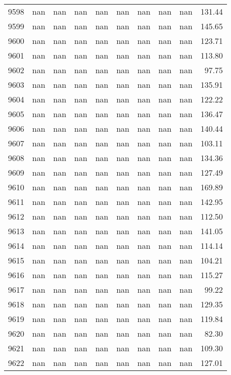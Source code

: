 \begin{tabular}{lrrrrrrrrr}
9598 & nan & nan & nan & nan & nan & nan & nan & nan & 131.44 \\
9599 & nan & nan & nan & nan & nan & nan & nan & nan & 145.65 \\
9600 & nan & nan & nan & nan & nan & nan & nan & nan & 123.71 \\
9601 & nan & nan & nan & nan & nan & nan & nan & nan & 113.80 \\
9602 & nan & nan & nan & nan & nan & nan & nan & nan & 97.75 \\
9603 & nan & nan & nan & nan & nan & nan & nan & nan & 135.91 \\
9604 & nan & nan & nan & nan & nan & nan & nan & nan & 122.22 \\
9605 & nan & nan & nan & nan & nan & nan & nan & nan & 136.47 \\
9606 & nan & nan & nan & nan & nan & nan & nan & nan & 140.44 \\
9607 & nan & nan & nan & nan & nan & nan & nan & nan & 103.11 \\
9608 & nan & nan & nan & nan & nan & nan & nan & nan & 134.36 \\
9609 & nan & nan & nan & nan & nan & nan & nan & nan & 127.49 \\
9610 & nan & nan & nan & nan & nan & nan & nan & nan & 169.89 \\
9611 & nan & nan & nan & nan & nan & nan & nan & nan & 142.95 \\
9612 & nan & nan & nan & nan & nan & nan & nan & nan & 112.50 \\
9613 & nan & nan & nan & nan & nan & nan & nan & nan & 141.05 \\
9614 & nan & nan & nan & nan & nan & nan & nan & nan & 114.14 \\
9615 & nan & nan & nan & nan & nan & nan & nan & nan & 104.21 \\
9616 & nan & nan & nan & nan & nan & nan & nan & nan & 115.27 \\
9617 & nan & nan & nan & nan & nan & nan & nan & nan & 99.22 \\
9618 & nan & nan & nan & nan & nan & nan & nan & nan & 129.35 \\
9619 & nan & nan & nan & nan & nan & nan & nan & nan & 119.84 \\
9620 & nan & nan & nan & nan & nan & nan & nan & nan & 82.30 \\
9621 & nan & nan & nan & nan & nan & nan & nan & nan & 109.30 \\
9622 & nan & nan & nan & nan & nan & nan & nan & nan & 127.01 \\

\end{tabular}
